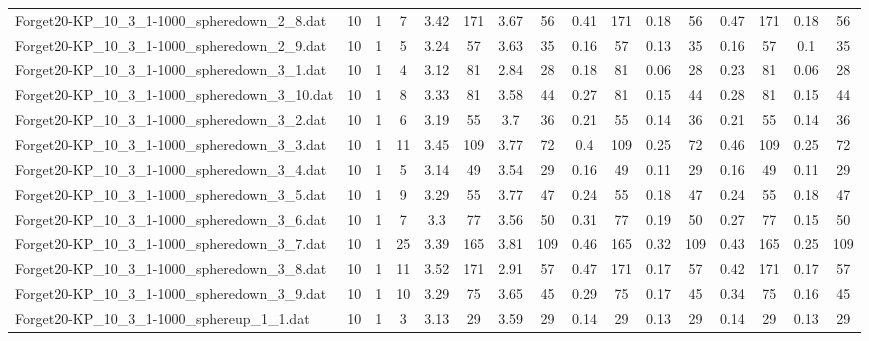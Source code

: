 \begin{sidewaystable}[!ht]
{\begin{tabular}{lccccccccccccccc}
Forget20-KP\_10\_3\_1-1000\_spheredown\_2\_8.dat & 10 & 1 & 7 & 3.42 & 171 & 3.67 & 56 & 0.41 & 171 &  \textcolor{blue2}{0.18} & 56 & 0.47 & 171 &  \textcolor{blue2}{0.18} & 56 \\
Forget20-KP\_10\_3\_1-1000\_spheredown\_2\_9.dat & 10 & 1 & 5 & 3.24 & 57 & 3.63 & 35 & 0.16 & 57 & 0.13 & 35 & 0.16 & 57 &  \textcolor{blue2}{0.1} & 35 \\
Forget20-KP\_10\_3\_1-1000\_spheredown\_3\_1.dat & 10 & 1 & 4 & 3.12 & 81 & 2.84 & 28 & 0.18 & 81 &  \textcolor{blue2}{0.06} & 28 & 0.23 & 81 &  \textcolor{blue2}{0.06} & 28 \\
Forget20-KP\_10\_3\_1-1000\_spheredown\_3\_10.dat & 10 & 1 & 8 & 3.33 & 81 & 3.58 & 44 & 0.27 & 81 &  \textcolor{blue2}{0.15} & 44 & 0.28 & 81 &  \textcolor{blue2}{0.15} & 44 \\
Forget20-KP\_10\_3\_1-1000\_spheredown\_3\_2.dat & 10 & 1 & 6 & 3.19 & 55 & 3.7 & 36 & 0.21 & 55 &  \textcolor{blue2}{0.14} & 36 & 0.21 & 55 &  \textcolor{blue2}{0.14} & 36 \\
Forget20-KP\_10\_3\_1-1000\_spheredown\_3\_3.dat & 10 & 1 & 11 & 3.45 & 109 & 3.77 & 72 & 0.4 & 109 &  \textcolor{blue2}{0.25} & 72 & 0.46 & 109 &  \textcolor{blue2}{0.25} & 72 \\
Forget20-KP\_10\_3\_1-1000\_spheredown\_3\_4.dat & 10 & 1 & 5 & 3.14 & 49 & 3.54 & 29 & 0.16 & 49 &  \textcolor{blue2}{0.11} & 29 & 0.16 & 49 &  \textcolor{blue2}{0.11} & 29 \\
Forget20-KP\_10\_3\_1-1000\_spheredown\_3\_5.dat & 10 & 1 & 9 & 3.29 & 55 & 3.77 & 47 & 0.24 & 55 &  \textcolor{blue2}{0.18} & 47 & 0.24 & 55 &  \textcolor{blue2}{0.18} & 47 \\
Forget20-KP\_10\_3\_1-1000\_spheredown\_3\_6.dat & 10 & 1 & 7 & 3.3 & 77 & 3.56 & 50 & 0.31 & 77 & 0.19 & 50 & 0.27 & 77 &  \textcolor{blue2}{0.15} & 50 \\
Forget20-KP\_10\_3\_1-1000\_spheredown\_3\_7.dat & 10 & 1 & 25 & 3.39 & 165 & 3.81 & 109 & 0.46 & 165 & 0.32 & 109 & 0.43 & 165 &  \textcolor{blue2}{0.25} & 109 \\
Forget20-KP\_10\_3\_1-1000\_spheredown\_3\_8.dat & 10 & 1 & 11 & 3.52 & 171 & 2.91 & 57 & 0.47 & 171 &  \textcolor{blue2}{0.17} & 57 & 0.42 & 171 &  \textcolor{blue2}{0.17} & 57 \\
Forget20-KP\_10\_3\_1-1000\_spheredown\_3\_9.dat & 10 & 1 & 10 & 3.29 & 75 & 3.65 & 45 & 0.29 & 75 & 0.17 & 45 & 0.34 & 75 &  \textcolor{blue2}{0.16} & 45 \\
Forget20-KP\_10\_3\_1-1000\_sphereup\_1\_1.dat & 10 & 1 & 3 & 3.13 & 29 & 3.59 & 29 & 0.14 & 29 &  \textcolor{blue2}{0.13} & 29 & 0.14 & 29 &  \textcolor{blue2}{0.13} & 29 \\

\end{tabular}}
\end{sidewaystable}
